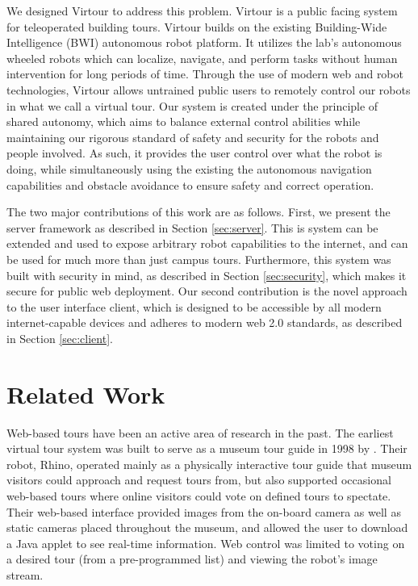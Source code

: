 \documentclass[
  oneside,
  11pt, a4paper,
  footinclude=true,
  headinclude=true,
  cleardoublepage=empty
]{article}
\begin{document}
We designed Virtour to address this problem. Virtour is a public facing system
for teleoperated building tours. Virtour builds on the existing Building-Wide
Intelligence (BWI) autonomous robot platform. It utilizes the lab's autonomous
wheeled robots which can localize, navigate, and perform tasks without human
intervention for long periods of time. Through the use of modern web and robot
technologies, Virtour allows untrained public users to remotely control our
robots in what we call a virtual tour. Our system is created under the
principle of shared autonomy, which aims to balance external control abilities
while maintaining our rigorous standard of safety and security for the robots
and people involved. As such, it provides the user control over what the robot
is doing, while simultaneously using the existing the autonomous navigation
capabilities and obstacle avoidance to ensure safety and correct operation.

The two major contributions of this work are as follows. First, we present the
server framework as described in Section \ref{sec:server}. This is system can
be extended and used to expose arbitrary robot capabilities to the internet,
and can be used for much more than just campus tours. Furthermore, this system
was built with security in mind, as described in Section \ref{sec:security},
which makes it secure for public web deployment. Our second contribution is the
novel approach to the user interface client, which is designed to be accessible
by all modern internet-capable devices and adheres to modern web 2.0 standards,
as described in Section \ref{sec:client}.

\section{Related Work}\label{sec:related}

Web-based tours have been an active area of research in the past. The earliest
virtual tour system was built to serve as a museum tour guide in 1998 by
\citet{burgard1998}. Their robot, Rhino, operated mainly as a physically
interactive tour guide that museum visitors could approach and request tours
from, but also supported occasional web-based tours where online visitors could
vote on defined tours to spectate. Their web-based interface provided images from
the on-board camera as well as static cameras placed throughout the museum, and
allowed the user to download a Java applet to see real-time information. Web
control was limited to voting on a desired tour (from a pre-programmed list)
and viewing the robot's image stream.
\end{document}
